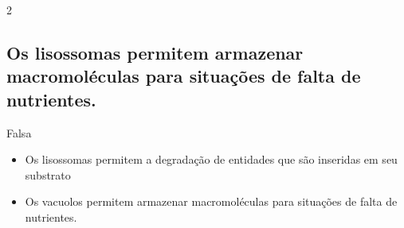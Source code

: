 \documentclass[\mainfilename]{subfiles}
\begin{document}
\begin{questionBox}2{} %
    
    \subsection*{Os lisossomas permitem armazenar macromoléculas para situações de falta de nutrientes.}

    \begin{answerBox}{} %
        Falsa
        \begin{itemize}
            \item Os lisossomas permitem a degradação de entidades que são inseridas em seu substrato
            \item Os vacuolos permitem armazenar macromoléculas para situações de falta de nutrientes.
        \end{itemize}
    \end{answerBox}

\end{questionBox}
\end{document}
